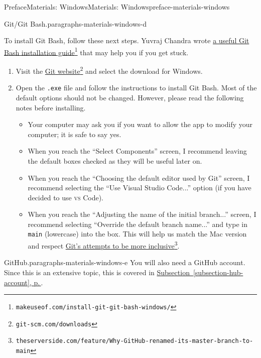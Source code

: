 \documentclass[twoside,10pt,]{book}
\newcommand{\xreffont}{\relax}
\newcommand{\mono}[1]{\texttt{#1}}
\newcommand{\initialism}[1]{\textsc{\MakeLowercase{#1}}}
\begin{document}
\begin{preface}{Preface}{Materials: Windows}{}{Materials: Windows}{}{}{preface-materials-windows}
\begin{paragraphs}{Git\slash{}Git Bash.}{paragraphs-materials-windows-d}
\par
To install Git Bash, follow these next steps. Yuvraj Chandra wrote \href{https://www.makeuseof.com/install-git-git-bash-windows/}{a useful Git Bash installation guide}\footnote{\nolinkurl{makeuseof.com/install-git-git-bash-windows/}\label{fn-materials-windows-d-d-b}} that may help you if you get stuck.%
\begin{enumerate}
\item{}Visit the \href{https://git-scm.com/downloads}{Git website}\footnote{\nolinkurl{git-scm.com/downloads}\label{fn-materials-windows-d-d-c-a-a-b}} and select the download for Windows.%
\item{}Open the \mono{.exe} file and follow the instructions to install Git Bash. Most of the default options should not be changed. However, please read the following notes before installing.%
\begin{itemize}[label=\textbullet]
\item{}Your computer may ask you if you want to allow the app to modify your computer; it is safe to say yes.%
\item{}When you reach the ``Select Components'' screen, I recommend leaving the default boxes checked as they will be useful later on.%
\item{}When you reach the ``Choosing the default editor used by Git'' screen, I recommend selecting the ``Use Visual Studio Code...'' option (if you have decided to use \initialism{VS} Code).%
\item{}When you reach the ``Adjusting the name of the initial branch...'' screen, I recommend selecting ``Override the default branch name...'' and type in \mono{main} (lowercase) into the box. This will help us match the Mac version and respect \href{https://www.theserverside.com/feature/Why-GitHub-renamed-its-master-branch-to-main}{Git's attempts to be more inclusive}\footnote{\nolinkurl{theserverside.com/feature/Why-GitHub-renamed-its-master-branch-to-main}\label{fn-materials-windows-d-d-c-b-a-b-d-a-e}}.%
\end{itemize}
%
\end{enumerate}
%
\end{paragraphs}%
\begin{paragraphs}{GitHub.}{paragraphs-materials-windows-e}%
You will also need a GitHub account. Since this is an extensive topic, this is covered in \hyperref[subsection-hub-account]{Subsection~{\xreffont\ref{subsection-hub-account}}, p.\,\pageref{subsection-hub-account}}.%
\end{paragraphs}%
\end{preface}
\end{document}
